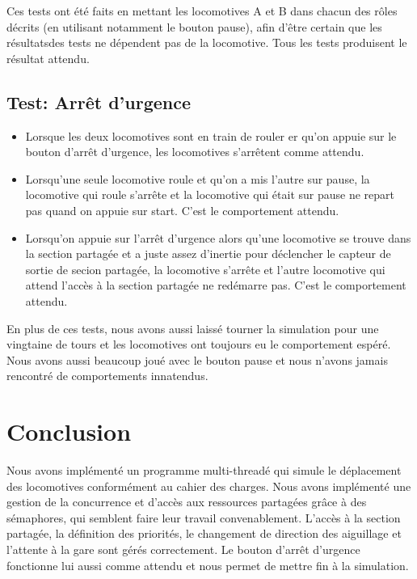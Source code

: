 \documentclass{article}
\begin{document}
Ces tests ont été faits en mettant les locomotives A et B dans chacun des rôles décrits (en utilisant notamment le bouton pause), 
afin d'être certain que les résultatsdes tests ne dépendent pas de la locomotive. Tous les tests produisent le résultat attendu.

\subsection*{Test: Arrêt d'urgence}

\begin{itemize}

\item Lorsque les deux locomotives sont en train de rouler er qu'on appuie sur le bouton d'arrêt d'urgence, les locomotives s'arrêtent comme attendu.
\item Lorsqu'une seule locomotive roule et qu'on a mis l'autre sur pause, la locomotive qui roule s'arrête et la locomotive qui était sur pause ne
repart pas quand on appuie sur start. C'est le comportement attendu.
\item Lorsqu'on appuie sur l'arrêt d'urgence alors qu'une locomotive se trouve dans la section partagée et a juste assez d'inertie pour déclencher
le capteur de sortie de secion partagée, la locomotive s'arrête et l'autre locomotive qui attend l'accès à la section partagée ne redémarre pas. 
C'est le comportement attendu.

\end{itemize}

En plus de ces tests, nous avons aussi laissé tourner la simulation pour une vingtaine de tours et les locomotives ont toujours eu le comportement
espéré. Nous avons aussi beaucoup joué avec le bouton pause et nous n'avons jamais rencontré de comportements innatendus.

\section*{Conclusion}
Nous avons implémenté un programme multi-threadé qui simule le déplacement des locomotives conformément au cahier des charges. Nous avons implémenté une 
gestion de la concurrence et d'accès aux ressources partagées grâce à des sémaphores, qui semblent faire leur travail convenablement. L'accès à la section 
partagée, la définition des priorités, le changement de direction des aiguillage et l'attente à la gare sont gérés correctement. Le bouton d'arrêt d'urgence 
fonctionne lui aussi comme attendu et nous permet de mettre fin à la simulation.
\end{document}
